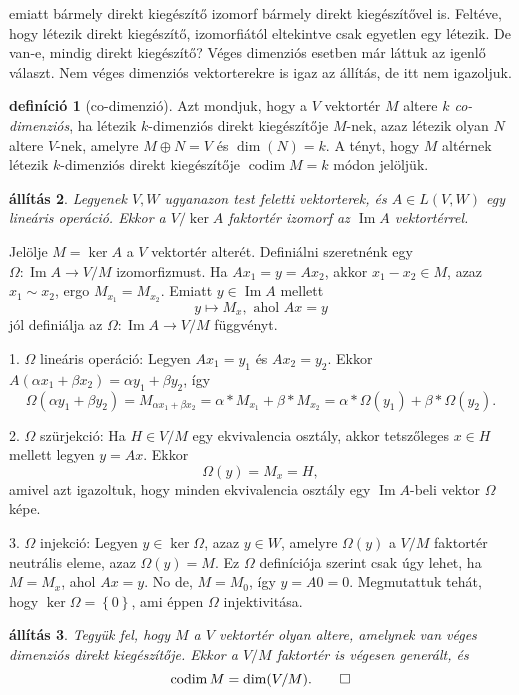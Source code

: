 \documentclass[9pt, a4paper, showtrims]{memoir}
\makeatletter
\renewenvironment{proof}[1][\proofname]
    {\par\pushQED{\qed}%
    \normalfont \topsep6\p@\@plus6\p@\relax
    \trivlist
    \item[\hskip\labelsep
        \itshape
    #1\@addpunct{:}]\ignorespaces}
    {\popQED\endtrivlist\@endpefalse}
\theoremstyle{plain}
\newtheorem{proposition}{állítás}[chapter]
\theoremstyle{remark}
\theoremstyle{definition}
\newtheorem{definition}[proposition]{definíció}
\DeclareMathOperator{\codim}{codim}
\DeclareMathOperator{\im}{Im}
\makeatother
\begin{document}
emiatt bármely direkt kiegészítő izomorf bármely direkt kiegészítővel is.
Feltéve, hogy
létezik direkt kiegészítő, izomorfiától eltekintve csak egyetlen egy létezik.
De van-e, mindig direkt kiegészítő?
Véges dimenziós esetben már láttuk az igenlő választ.
Nem véges dimenziós vektorterekre is igaz az állítás, de itt nem igazoljuk.
\begin{definition}[co-dimenzió]
	Azt mondjuk, hogy a $V$ vektortér $M$ altere \emph{$k$ co-dimenziós},
	ha létezik $k$-dimenziós direkt kiegészítője $M$-nek,
	azaz létezik olyan $N$ altere $V$-nek, amelyre $M\oplus N=V$
	és $\dim(N)=k$.
	A tényt,
	hogy $M$ altérnek létezik $k$-dimenziós direkt kiegészítője
	$\codim M=k$ módon jelöljük.
\end{definition}
\begin{proposition}
	Legyenek $V,W$ ugyanazon test feletti vektorterek,
	és $A\in L\left( V,W \right)$ egy lineáris operáció.
	Ekkor a
	\(
	V/\ker A
	\)
	faktortér izomorf az $\im A$ vektortérrel.
\end{proposition}
\begin{proof}
	Jelölje $M=\ker A$ a $V$ vektortér alterét.
	Definiálni szeretnénk egy $\Omega:\im A\to V/M$ izomorfizmust.
	Ha $Ax_1=y=Ax_2$, akkor $x_1-x_2\in M$, azaz $x_1\sim x_2$, ergo $M_{x_1}=M_{x_2}$.
	Emiatt $y\in\im A$ mellett
	\[
		y\mapsto M_x, \text{ ahol } Ax=y
	\]
	jól definiálja az $\Omega:\im A\to V/M$ függvényt.

	1. $\Omega$ lineáris operáció:
	Legyen $Ax_1=y_1$ és $Ax_2=y_2$.
	Ekkor
	$A\left( \alpha x_1+\beta x_2 \right)=\alpha y_1+\beta y_2$, így
	\[
		\Omega\left( \alpha y_1+\beta y_2 \right)
		=
		M_{\alpha x_1+\beta x_2}
		=
		\alpha\ast M_{x_1}+\beta\ast M_{x_2}
		=
		\alpha\ast \Omega\left( y_1 \right)+\beta\ast\Omega\left( y_2 \right).
	\]

	2. $\Omega$ szürjekció:
	Ha $H\in V/M$ egy ekvivalencia osztály,
	akkor tetszőleges $x\in H$ mellett legyen $y=Ax$.
	Ekkor
	\[
		\Omega\left( y \right)=M_x=H,
	\]
	amivel azt igazoltuk,
	hogy minden ekvivalencia osztály egy $\im A$-beli vektor $\Omega$ képe.


	3. $\Omega$ injekció:
	Legyen $y\in\ker\Omega$, azaz $y\in W$, amelyre $\Omega\left( y \right)$ a $V/M$ faktortér neutrális eleme,
	azaz
	$\Omega\left( y \right)=M$.
	Ez $\Omega$ definíciója szerint csak úgy lehet, ha $M=M_x$, ahol $Ax=y$.
	No de, $M=M_0$, így $y=A0=0$.
	Megmutattuk tehát, hogy $\ker \Omega=\left\{ 0 \right\}$,
	ami éppen $\Omega$ injektivitása.
\end{proof}
\begin{proposition}
	Tegyük fel, hogy $M$ a $V$ vektortér olyan altere,
	amelynek van véges dimenziós direkt kiegészítője.
	Ekkor a $V/M$ faktortér is végesen generált, és
	\[
		\codim M=\dim(V/M).\qedhere
	\]
\end{proposition}
\end{document}
